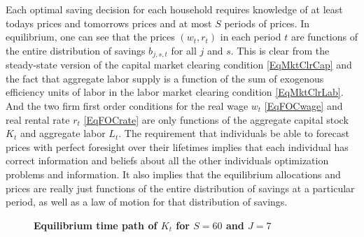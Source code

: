 \documentclass[letterpaper,12pt]{article}
\theoremstyle{definition}
\begin{document}
\begin{spacing}{1.5}
    Each optimal saving decision for each household requires knowledge of at least todays prices and tomorrows prices and at most $S$ periods of prices. In equilibrium, one can see that the prices $(w_t,r_t)$ in each period $t$ are functions of the entire distribution of savings $b_{j,s,t}$ for all $j$ and $s$. This is clear from the steady-state version of the capital market clearing condition \eqref{EqMktClrCap} and the fact that aggregate labor supply is a function of the sum of exogenous efficiency units of labor in the labor market clearing condition \eqref{EqMktClrLab}. And the two firm first order conditions for the real wage $w_t$ \eqref{EqFOCwage} and real rental rate $r_t$ \eqref{EqFOCrate} are only functions of the aggregate capital stock $K_t$ and aggregate labor $L_t$. The requirement that individuals be able to forecast prices with perfect foresight over their lifetimes implies that each individual has correct information and beliefs about all the other individuals optimization problems and information. It also implies that the equilibrium allocations and prices are really just functions of the entire distribution of savings at a particular period, as well as a law of motion for that distribution of savings.

    \begin{figure}[htb]\centering \captionsetup{width=4.0in}
      \caption{\label{FigKpathTPI}\textbf{Equilibrium time path of $K_t$ for $S=60$ and $J=7$}}
    \end{figure}


\end{spacing}
\end{document}
